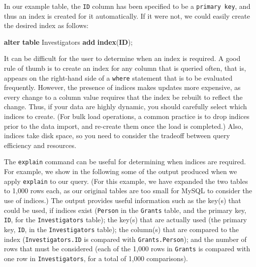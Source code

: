 \documentclass[]{krantz}
\newenvironment{Shaded}{\begin{snugshade}}{\end{snugshade}}
\newcommand{\KeywordTok}[1]{\textcolor[rgb]{0.13,0.29,0.53}{\textbf{#1}}}
\newcommand{\NormalTok}[1]{#1}
\begin{document}
In our example table, the \texttt{ID} column has been specified to be a
\texttt{primary\ key}, and thus an index is created for it
automatically. If it were not, we could easily create the desired index
as follows:

\begin{Shaded}
\begin{Highlighting}[]
\KeywordTok{alter} \KeywordTok{table}\NormalTok{ Investigators }\KeywordTok{add} \KeywordTok{index}\NormalTok{(}\KeywordTok{ID}\NormalTok{);}
\end{Highlighting}
\end{Shaded}

It can be difficult for the user to determine when an index is required.
A good rule of thumb is to create an index for any column that is
queried often, that is, appears on the right-hand side of a
\texttt{where} statement that is to be evaluated frequently. However,
the presence of indices makes updates more expensive, as every change to
a column value requires that the index be rebuilt to reflect the change.
Thus, if your data are highly dynamic, you should carefully select which
indices to create. (For bulk load operations, a common practice is to
drop indices prior to the data import, and re-create them once the load
is completed.) Also, indices take disk space, so you need to consider
the tradeoff between query efficiency and resources.

The \texttt{explain} command can be useful for determining when indices
are required. For example, we show in the following some of the output
produced when we apply \texttt{explain} to our query. (For this example,
we have expanded the two tables to 1,000 rows each, as our original
tables are too small for MySQL to consider the use of indices.) The
output provides useful information such as the key(s) that could be
used, if indices exist (\texttt{Person} in the \texttt{Grants} table,
and the primary key, \texttt{ID}, for the \texttt{Investigators} table);
the key(s) that are actually used (the primary key, \texttt{ID}, in the
\texttt{Investigators} table); the column(s) that are compared to the
index (\texttt{Investigators.ID} is compared with
\texttt{Grants.Person}); and the number of rows that must be considered
(each of the 1,000 rows in \texttt{Grants} is compared with one row in
\texttt{Investigators}, for a total of 1,000 comparisons).
\end{document}
